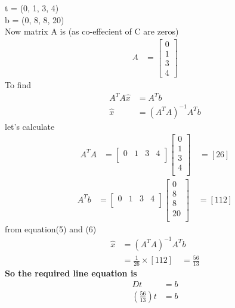\documentclass[10pt, a4paper]{article}
\begin{document}

t = (0, 1, 3, 4) \\
b = (0, 8, 8, 20) \\

Now matrix A is (as co-effecient of C are zeros)
\begin{align*}
    A &= \begin{bmatrix}
        0 \\
        1 \\
        3 \\
        4 
    \end{bmatrix} 
\end{align*}
To find
\begin{align*}
    A^TA\hat{x} &=  A^Tb \\
    \hat{x}     &=  (A^TA)^{-1}A^Tb 
\end{align*}
let's calculate\\
\begin{align*}
    A^TA &= \begin{bmatrix}
        0 & 1 & 3 & 4 \\
    \end{bmatrix}
    \begin{bmatrix}
        0 \\
        1 \\
        3 \\
        4 \\
    \end{bmatrix} \quad 
    = [26] \tag{5}
\end{align*}
\begin{align*}
    A^Tb &= \begin{bmatrix}
        0 & 1 & 3 & 4 \\
    \end{bmatrix}
    \begin{bmatrix}
        0 \\
        8 \\
        8 \\
        20 \\
    \end{bmatrix} \quad 
    = [112] \tag{6}
\end{align*}
from equation(5) and (6) 
\begin{align*}
    \hat{x} &= (A^TA)^{-1}A^Tb\\
            &= \frac{1}{26} \times [112]\quad
            = \frac{56}{13} \tag{7}
\end{align*}
\textbf{So the required line equation is }
\begin{align*}
    Dt &= b\\
    \left(\frac{56}{13}\right) t &= b
\end{align*}
\end{document}
